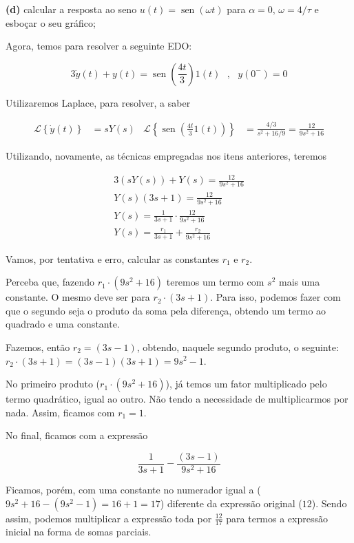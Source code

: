 \documentclass{article}
\DeclareMathOperator{\sen}{sen}
\begin{document}
\textbf{(d)} calcular a resposta ao seno $u(t) = \sen(\omega t)$ para $\alpha = 0,\, \omega = 4/\tau$ e esboçar o seu gráfico;

Agora, temos para resolver a seguinte EDO:

\[ 3\dot{y}(t) + y(t) = \sen\left(\frac{4t}{3}\right)1(t) \,\,\,\,,\,\,\,\, y(0^-) = 0\]

Utilizaremos Laplace, para resolver, a saber

\begin{align*}
    \mathcal{L}\left\{\dot{y}(t)\right\} &= sY(s) & \mathcal{L}\left\{\sen \left(\frac{4t}{3}1(t)\right) \right\} &= \frac{4/3}{s^2 + 16/9} = \frac{12}{9s^2 + 16}
\end{align*}

Utilizando, novamente, as técnicas empregadas nos itens anteriores, teremos

\begin{align*}
    3(sY(s)) + Y(s) = \frac{12}{9s^2 + 16}\\
    Y(s)(3s + 1) = \frac{12}{9s^2 + 16}\\
    Y(s) = \frac{1}{3s + 1} \cdot \frac{12}{9s^2 + 16}\\
    Y(s) = \frac{r_1}{3s + 1} + \frac{r_2}{9s^2 + 16}
\end{align*}

Vamos, por tentativa e erro, calcular as constantes $r_1 \text{ e } r_2$.

Perceba que, fazendo $r_1 \cdot (9s^2 + 16)$ teremos um termo com $s^2$ mais uma constante. O mesmo deve ser para $r_2 \cdot (3s + 1)$. Para isso, podemos fazer com que o segundo seja o produto da soma pela diferença, obtendo um termo ao quadrado e uma constante.

Fazemos, então $r_2 = (3s - 1)$, obtendo, naquele segundo produto, o seguinte: $r_2 \cdot (3s + 1) = (3s - 1) (3s + 1) = 9s^2 - 1$.

No primeiro produto ($r_1 \cdot (9s^2 + 16)$), já temos um fator multiplicado pelo termo quadrático, igual ao outro. Não tendo a necessidade de multiplicarmos por nada. Assim, ficamos com $r_1 = 1$.

No final, ficamos com a expressão

\[\frac{1}{3s + 1} - \frac{(3s - 1)}{9s^2 + 16}\]

Ficamos, porém, com uma constante no numerador igual a ($9s^2 + 16 - (9s^2 - 1) = 16 + 1 = 17$) diferente da expressão original ($12$). Sendo assim, podemos multiplicar a expressão toda por $\frac{12}{17}$ para termos a expressão inicial na forma de somas parciais.
\end{document}
